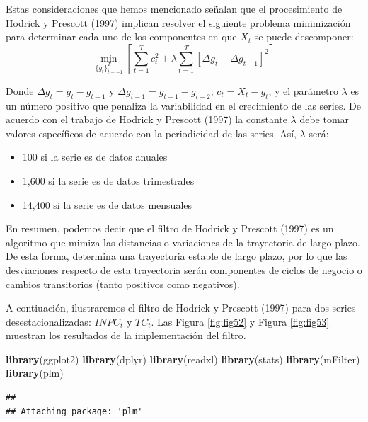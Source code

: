 \documentclass[
]{book}
\newenvironment{Shaded}{\begin{snugshade}}{\end{snugshade}}
\newcommand{\FunctionTok}[1]{\textcolor[rgb]{0.13,0.29,0.53}{\textbf{#1}}}
\newcommand{\NormalTok}[1]{#1}
\begin{document}
Estas consideraciones que hemos mencionado señalan que el procesimiento de Hodrick y Prescott (1997) implican resolver el siguiente problema minimización para determinar cada uno de los componentes en que \(X_t\) se puede descomponer:
\begin{equation}
    \min_{\{ g_t \}^T_{t = -1} } \left[ \sum^T_{t = 1} c^2_t + \lambda \sum^T_{t = 1} [ \Delta g_t - \Delta g_{t-1}]^2 \right]
\end{equation}

Donde \(\Delta g_t = g_t - g_{t-1}\) y \(\Delta g_{t-1} = g_{t-1} - g_{t-2}\); \(c_t = X_t - g_t\), y el parámetro \(\lambda\) es un número positivo que penaliza la variabilidad en el crecimiento de las series. De acuerdo con el trabajo de Hodrick y Prescott (1997) la constante \(\lambda\) debe tomar valores específicos de acuerdo con la periodicidad de las series. Así, \(\lambda\) será:

\begin{itemize}
    \item 100 si la serie es de datos anuales
    \item 1,600 si la serie es de datos trimestrales
    \item 14,400 si la serie es de datos mensuales
\end{itemize}

En resumen, podemos decir que el filtro de Hodrick y Prescott (1997) es un algoritmo que mimiza las distancias o variaciones de la trayectoria de largo plazo. De esta forma, determina una trayectoria estable de largo plazo, por lo que las desviaciones respecto de esta trayectoria serán componentes de ciclos de negocio o cambios transitorios (tanto positivos como negativos).

A contiuación, ilustraremos el filtro de Hodrick y Prescott (1997) para dos series desestacionalizadas: \(INPC_t\) y \(TC_t\). Las Figura \ref{fig:fig52} y Figura \ref{fig:fig53} muestran los resultados de la implementación del filtro.

\begin{Shaded}
\begin{Highlighting}[]
\FunctionTok{library}\NormalTok{(ggplot2)}
\FunctionTok{library}\NormalTok{(dplyr)}
\FunctionTok{library}\NormalTok{(readxl)}
\FunctionTok{library}\NormalTok{(stats)}
\FunctionTok{library}\NormalTok{(mFilter)}
\FunctionTok{library}\NormalTok{(plm)}
\end{Highlighting}
\end{Shaded}

\begin{verbatim}
## 
## Attaching package: 'plm'
\end{verbatim}
\end{document}
